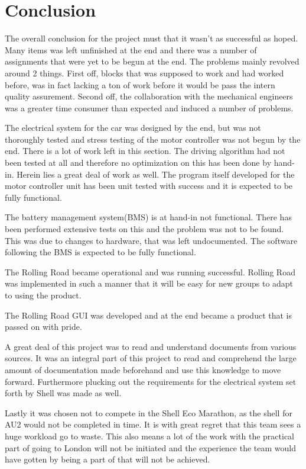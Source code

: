 \chapter{Conclusion}
The overall conclusion for the project must that it wasn't as successful as hoped. Many items was left unfinished at the end and there was a number of assignments that were yet to be begun at the end. The problems mainly revolved around 2 things. First off, blocks that was supposed to work and had worked before, was in fact lacking a ton of work before it would be pass the intern quality assurement. Second off, the collaboration with the mechanical engineers was a greater time consumer than expected and induced a number of problems.   

The electrical system for the car was designed by the end, but was not thoroughly tested and stress testing of the motor controller was not begun by the end. There is a lot of work left in this section. The driving algorithm had not been tested at all and therefore no optimization on this has been done by hand-in. Herein lies a great deal of work as well. The program itself developed for the motor controller unit has been unit tested with success and it is expected to be fully functional. 

The battery management system(BMS) is at hand-in not functional. There has been performed extensive tests on this and the problem was not to be found. This was due to changes to hardware, that was left undocumented. The software following the BMS is expected to be fully functional. 

The Rolling Road became operational and was running successful. Rolling Road was implemented in such a manner that it will be easy for new groups to adapt to using the product. 

The Rolling Road GUI was developed and at the end became a product that is passed on with pride.

A great deal of this project was to read and understand documents from various sources. It was an integral part of this project to read and comprehend the large amount of documentation made beforehand and use this knowledge to move forward. Furthermore plucking out the requirements for the electrical system set forth by Shell was made as well.

Lastly it was chosen not to compete in the Shell Eco Marathon, as the shell for AU2 would not be completed in time. It is with great regret that this team sees a huge workload go to waste. This also means a lot of the work with the practical part of going to London will not be initiated and the experience the team would have gotten by being a part of that will not be achieved.
